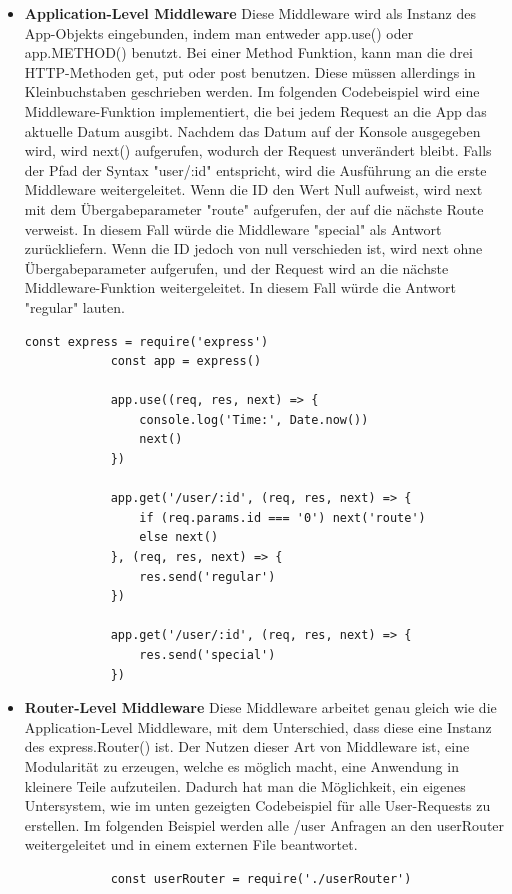 \begin{itemize}
    \item \textbf{Application-Level Middleware}
        \newline
        Diese Middleware wird als Instanz des App-Objekts eingebunden, indem man entweder app.use() oder app.METHOD() benutzt. Bei einer Method Funktion, kann man die drei HTTP-Methoden get, put oder post benutzen. Diese müssen allerdings in Kleinbuchstaben geschrieben werden.
        \newline
        Im folgenden Codebeispiel wird eine Middleware-Funktion implementiert, die bei jedem Request an die App das aktuelle Datum ausgibt. Nachdem das Datum auf der Konsole ausgegeben wird, wird next() aufgerufen, wodurch der Request unverändert bleibt. Falls der Pfad der Syntax "user/:id" entspricht, wird die Ausführung an die erste Middleware weitergeleitet. Wenn die ID den Wert Null aufweist, wird next mit dem Übergabeparameter "route" aufgerufen, der auf die nächste Route verweist. In diesem Fall würde die Middleware "special" als Antwort zurückliefern. Wenn die ID jedoch von null verschieden ist, wird next ohne Übergabeparameter aufgerufen, und der Request wird an die nächste Middleware-Funktion weitergeleitet. In diesem Fall würde die Antwort "regular" lauten.
        \newline
        \begin{lstlisting}[caption=Application-Level Middleware]
            const express = require('express')
            const app = express()

            app.use((req, res, next) => {
                console.log('Time:', Date.now())
                next()
            })
    
            app.get('/user/:id', (req, res, next) => {
                if (req.params.id === '0') next('route')
                else next()
            }, (req, res, next) => {
                res.send('regular')
            })

            app.get('/user/:id', (req, res, next) => {
                res.send('special')
            })
        \end{lstlisting}
    \item \textbf{Router-Level Middleware}
        \newline
        Diese Middleware arbeitet genau gleich wie die Application-Level Middleware, mit dem Unterschied, dass diese eine Instanz des express.Router() ist. Der Nutzen dieser Art von Middleware ist, eine Modularität zu erzeugen, welche es möglich macht, eine Anwendung in kleinere Teile aufzuteilen. Dadurch hat man die Möglichkeit, ein eigenes Untersystem, wie im unten gezeigten Codebeispiel für alle User-Requests zu erstellen. Im folgenden Beispiel werden alle /user Anfragen an den userRouter weitergeleitet und in einem externen File beantwortet.
        \begin{lstlisting}
            const userRouter = require('./userRouter')
            

\end{lstlisting}
\end{itemize}
